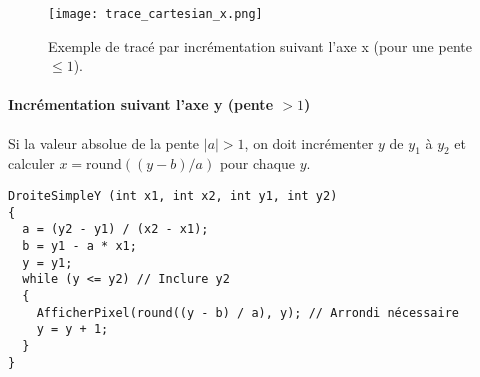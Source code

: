 \documentclass{article}
\begin{document}
\begin{figure}[H]
\centering
\texttt{[image: trace\_cartesian\_x.png]}
\caption{Exemple de tracé par incrémentation suivant l'axe x (pour une pente $\le 1$).}
\label{fig:trace_cartesian_x}
\end{figure}

\paragraph{Incrémentation suivant l'axe y (pente $> 1$)}
Si la valeur absolue de la pente $|a| > 1$, on doit incrémenter $y$ de $y_1$ à $y_2$ et calculer $x = \text{round}((y - b) / a)$ pour chaque $y$.

\begin{lstlisting}[language=Pseudocode, caption={Algorithme simple basé sur l'équation cartésienne (incrémentation en y)}, label={lst:droitesimple_y}]
DroiteSimpleY (int x1, int x2, int y1, int y2)
{
  a = (y2 - y1) / (x2 - x1);
  b = y1 - a * x1;
  y = y1;
  while (y <= y2) // Inclure y2
  {
    AfficherPixel(round((y - b) / a), y); // Arrondi nécessaire
    y = y + 1;
  }
}
\end{lstlisting}
\end{document}
